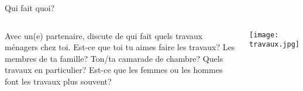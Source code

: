 \begin{frame}{Qui fait quoi?}
  \begin{columns}
      Avec un(e) partenaire, discute de qui fait quels travaux ménagers chez toi.
      Est-ce que toi tu aimes faire les travaux?
      Les membres de ta famille?
      Ton/ta camarade de chambre?
      Quels travaux en particulier?
      Est-ce que les femmes ou les hommes font les travaux plus souvent?
      \begin{center}
        \texttt{[image: travaux.jpg]}
      \end{center}
  \end{columns}
\end{frame}